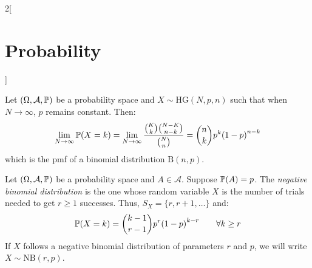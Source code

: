\documentclass[../../../main.tex]{subfiles}
\begin{document}
\begin{multicols}{2}[\section{Probability}]
\begin{definition}
  \end{definition}
  \begin{theorem}
    Let $(\Omega,\mathcal{A},\mathbb{P})$ be a probability space and $X\sim \text{HG}(N,p,n)$ such that when $N\to\infty$, $p$ remains constant. Then:
    $$\lim_{N\to\infty}\mathbb{P}(X=k)=\lim_{N\to\infty}\frac{\binom{K}{k}\binom{N-K}{n-k}}{\binom{N}{n}}=\binom{n}{k}p^k{(1-p)}^{n-k}$$ which is the pmf of a binomial distribution $\text{B}(n,p)$.
  \end{theorem}
  \begin{definition}
    Let $(\Omega,\mathcal{A},\mathbb{P})$ be a probability space and $A\in\mathcal{A}$. Suppose $\mathbb{P}(A)=p$. The \emph{negative binomial distribution} is the one whose random variable $X$ is the number of trials needed to get $r\geq 1$ successes. Thus, $S_X=\{r,r+1,\ldots\}$ and: $$\mathbb{P}(X=k)=\binom{k-1}{r-1}p^r{(1-p)}^{k-r}\qquad \forall k\geq r$$ If $X$ follows a negative binomial distribution of parameters $r$ and $p$, we will write $X\sim \text{NB}(r,p)$.
  \end{definition}

\end{multicols}
\end{document}
